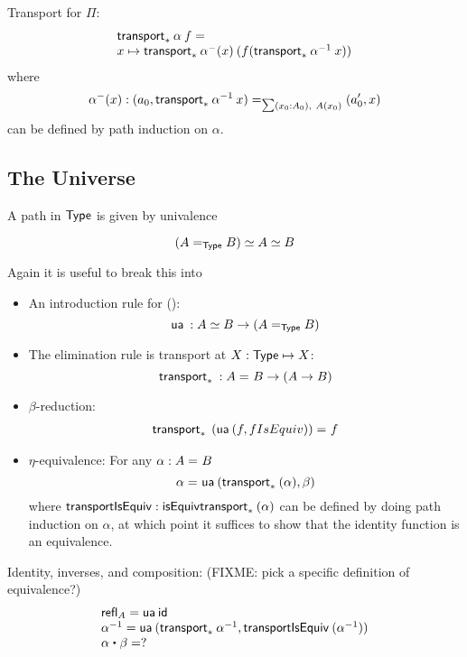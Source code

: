 Transport for $\Pi$:  
\[
\begin{array}{l}
\transport{x_0:A_0 \mapsto \prd{x : A(x_0)} B(x_0)}{\alpha} \: f =  \\
   x \mapsto 
   \transport{(p : \sm {x_0:A_0} A) \mapsto B(\proj{1} \: p, \proj{2} \: p)}{\alpha^{\mathord{-}}(x) } 
      \: (f (\transport{x:A_0 \mapsto A(x)}{\opp \alpha}\:  x))
\end{array}
\]
where 
\[
\alpha^-(x) : \id[\sm {x_0:A_0} A(x_0)] {(a_0 , \transport{x_0 \mapsto A(x_0)} {\opp \alpha} \: x)} {(a_0' , x)}
\]
can be defined by path induction on $\alpha$.  

\subsection{The Universe}

A path in $\type$ is given by univalence

\[
\eqv{(\id[\type]{A}{B})}{\eqv A B}
\]

Again it is useful to break this into 

\newcommand\isequiv{\mathsf{isEquiv}}

\begin{itemize}
\item An introduction rule for {()}:
  \[
  \ua{} : {\eqv A B} \to (\id[\type]{A}{B})
  \]
\item The elimination rule is transport at $X:\type \mapsto X$:
  \[
  \transport{X \mapsto X}{} : \id{A}{B} \to (A \to B)
  \]
\item $\beta$-reduction: 
  \[
  \begin{array}{l}
  \id{\transport{X \mapsto X} \: (\ua {(f, fIsEquiv)})}{f}
  \end{array}
  \]
\item $\eta$-equivalence: For any $\alpha : \id A B$
  \[
  \id{\alpha}{\ua {(\transport{X \mapsto X}(\alpha) , \beta)}}
  \]
  where $\mathsf{transportIsEquiv} : \isequiv{\transport{X \mapsto X}(\alpha)}$ can be
  defined by doing path induction on $\alpha$, at which point it
  suffices to show that the identity function is an equivalence.  
\end{itemize}

Identity, inverses, and composition: (FIXME: pick a specific definition
of equivalence?)
\[
\begin{array}{l}
\refl{A} = \ua{\idfunc} \\
\opp{\alpha} = \ua {(\transport {X \mapsto X} {\opp \alpha}, \mathsf{transportIsEquiv} \: (\opp \alpha))} \\ 
{\alpha} \ct \beta = ? \\
\end{array}
\]

